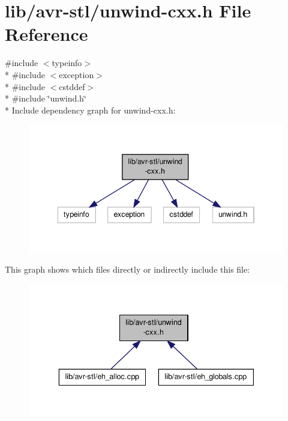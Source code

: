 \hypertarget{unwind-cxx_8h}{\section{lib/avr-\/stl/unwind-\/cxx.h File Reference}
\label{unwind-cxx_8h}
}
{\ttfamily \#include $<$typeinfo$>$}\\*
{\ttfamily \#include $<$exception$>$}\\*
{\ttfamily \#include $<$cstddef$>$}\\*
{\ttfamily \#include \char`\"{}unwind.\-h\char`\"{}}\\*
Include dependency graph for unwind-\/cxx.h\-:\nopagebreak
\begin{figure}[H]
\begin{center}
\leavevmode
\includegraphics[width=346pt]{unwind-cxx_8h__incl}
\end{center}
\end{figure}
This graph shows which files directly or indirectly include this file\-:\nopagebreak
\begin{figure}[H]
\begin{center}
\leavevmode
\includegraphics[width=336pt]{unwind-cxx_8h__dep__incl}
\end{center}
\end{figure}
